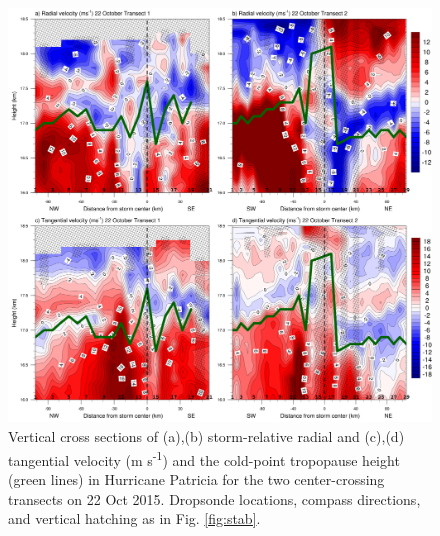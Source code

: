 \begin{figure}[ht]
\centerline{\includegraphics[width=39pc]{figures/fig10_velocities.png}}
\caption{Vertical cross sections of (a),(b) storm-relative radial and (c),(d) tangential velocity (m s\textsuperscript{-1}) and the cold-point tropopause height (green lines) in Hurricane Patricia for the two center-crossing transects on 22 Oct 2015. Dropsonde locations, compass directions, and vertical hatching as in Fig. \ref{fig:stab}.}
\label{fig:velocities}
\end{figure}
